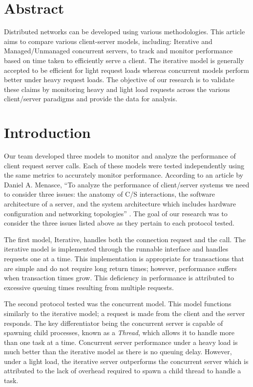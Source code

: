 \section*{Abstract}

Distributed networks can be developed using various methodologies. 
This article aims to compare various client-server models, including: 
Iterative and Managed/Unmanaged concurrent servers, to track and monitor performance based on time taken to efficiently serve a client. 
The iterative model is generally accepted to be efficient for light request loads whereas concurrent models perform better under heavy request loads. 
The objective of our research is to validate these claims by monitoring heavy and light load requests across the various client/server paradigms and provide the data for analysis.

\section{Introduction}

Our team developed three models to monitor and analyze the performance of client request server calls. 
Each of these models were tested independently using the same metrics to accurately monitor performance. 
According to an article by Daniel A. Menasce, 
``To analyze the performance of client/server systems we need to consider three issues: the anatomy of C/S interactions, the software architecture of a server, and the system architecture which includes hardware configuration and networking topologies'' \cite{menasce}.
The goal of our research was to consider the three issues listed above as they pertain to each protocol tested. 

The first model, Iterative, handles both the connection request and the call. 
The iterative model is implemented through the runnable interface and handles requests one at a time. 
This implementation is appropriate for transactions that are simple and do not require long return times; however, performance suffers when transaction times grow. 
This deficiency in performance is attributed to excessive queuing times resulting from multiple requests. 

The second protocol tested was the concurrent model. 
This model functions similarly to the iterative model; a request is made from the client and the server responds. 
The key differentiator being the concurrent server is capable of spawning child processes, known as a \textit{Thread}, which allows it to handle more than one task at a time. 
Concurrent server performance under a heavy load is much better than the iterative model as there is no queuing delay. 
However, under a light load, the iterative server outperforms the concurrent server which is attributed to the lack of overhead required to spawn a child thread to handle a task. 

